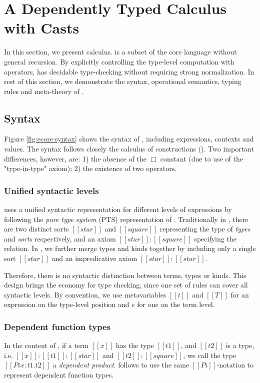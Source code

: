 \section{A Dependently Typed Calculus with Casts}\label{sec:ecore}

In this section, we present \ecore calculus. \ecore is a subset of the core
language \name without general recursion. By explicitly controlling the type-level
computation with \cast operators, \ecore has decidable type-checking
without requiring strong normalization. In rest of this
section, we demonstrate the syntax, operational semantics, typing
rules and meta-theory of \ecore.

\subsection{Syntax}\label{sec:ecore:syn}
Figure \ref{fig:ecore:syntax} shows the syntax of \ecore, including
expressions, contexts and values. The syntax follows closely the
calculus of constructions (\cc). Two important differences, however, are: 1)
the absence of the $\Box$ constant (due to use of the "type-in-type"
axiom); 2) the existence of two \cast operators.

\subsubsection{Unified syntactic levels}
\ecore uses a unified syntactic representation for different levels of
expressions by following the \emph{pure type system} (PTS)
representation of \cc. Traditionally in \cc, there are two distinct
sorts $[[star]]$ and $[[square]]$ representing the type of
\emph{types} and \emph{sorts} respectively, and an axiom
$[[star]]:[[square]]$ specifying the relation. In \ecore, we further
merge types and kinds together by including only a single sort
$[[star]]$ and an impredicative axiom $[[star]]:[[star]]$. 

Therefore, there is no syntactic distinction between terms, types or
kinds. This design brings the economy for type checking, since one set
of rules can cover all syntactic levels. By convention, we use
metavariables $[[t]]$ and $[[T]]$ for an expression on the type-level
position and $e$ for one on the term level.

\subsubsection{Dependent function types}
In the context of \cc, if a term $[[x]]$ has the type $[[t1]]$, and $[[t2]]$ is a type, i.e. $[[x]]:[[t1]]:[[star]]$ and $[[t2]]:[[square]]$, we call the type $[[Pi x:t1.t2]]$ a \emph{dependent product}. \ecore follows \cc to use the same $[[Pi]]$-notation to represent dependent function types.

